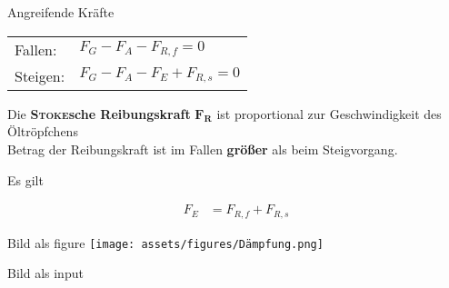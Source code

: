 \begin{frame}{Angreifende Kräfte}
    \begin{block}{}
        \begin{tabular}{ll}
            Fallen: & $F_G - F_A - F_{R,f} = 0$ \\
            Steigen: & $F_G - F_A - F_E + F_{R,s} = 0$
        \end{tabular}
    \end{block}

    Die \textbf{\textsc{Stoke}sche Reibungskraft} $\pmb{F_R}$ ist proportional zur Geschwindigkeit des Öltröpfchens \\
    \textrightarrow\space Betrag der Reibungskraft ist im Fallen \textbf{größer} als beim Steigvorgang.

    \vspace{1em}
    Es gilt
    \begin{block}{}
        \begin{align*} 
            F_E &= F_{R,f} + F_{R,s}
        \end{align*}
    \end{block}
\end{frame}

\begin{frame}{Bild als figure}
    \centering
    \texttt{[image: assets/figures/Dämpfung.png]}
\end{frame}

\begin{frame}{Bild als input}
    
\end{frame}